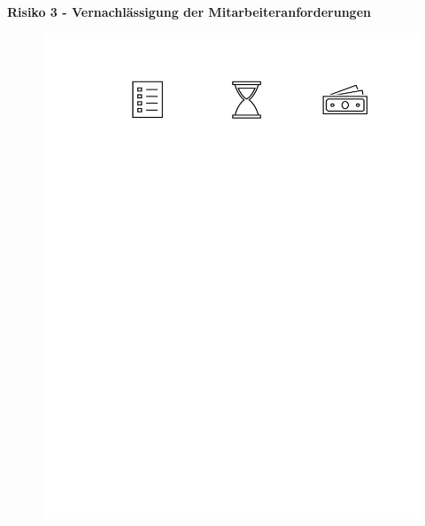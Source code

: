 
\vspace*{0.3cm}
\textbf{Risiko 3 - Vernachlässigung der Mitarbeiteranforderungen}
\vspace*{0.1cm}

\begin{figure}
	\includegraphics[width=\linewidth]{img/Risikotyp_Leistung}
\end{figure}

